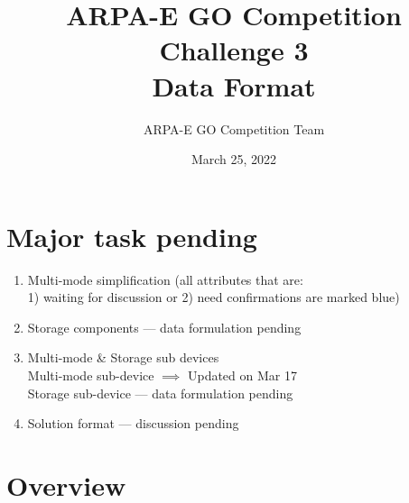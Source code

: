 \documentclass{article}
\title{ARPA-E GO Competition Challenge 3 \\ Data Format}
\author{ARPA-E GO Competition Team}
\date{March 25, 2022}
\begin{document}
\maketitle
{\color{red}
\section*{Major task pending}
\begin{enumerate}
    \item Multi-mode simplification (all attributes that are:\\
    1) waiting for discussion or 2) need confirmations are marked blue)
    \item Storage components --- data formulation pending
    \item Multi-mode \& Storage sub devices\\
        Multi-mode sub-device $\implies$ Updated on Mar 17 \\
        Storage sub-device --- data formulation pending \\
    \item Solution format --- discussion pending
\end{enumerate}
}
\section{Overview}
\end{document}
